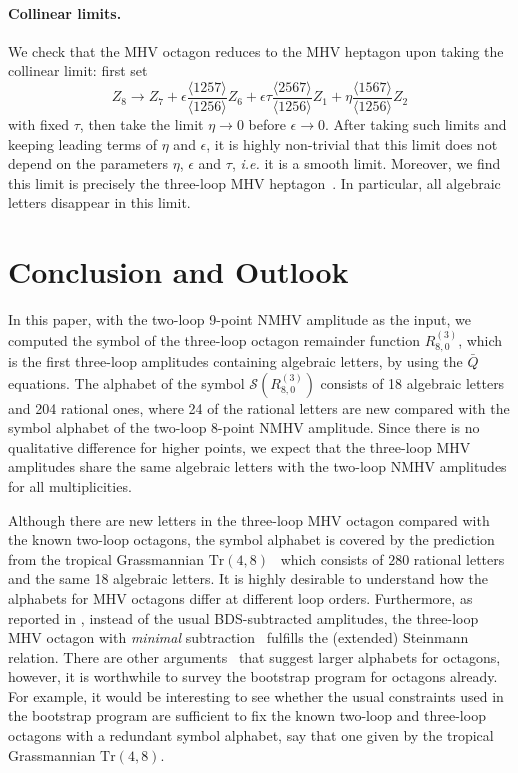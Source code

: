 \documentclass[a4paper,12pt]{article}
\begin{document}
\paragraph*{Collinear limits.} We check that the MHV octagon reduces to the MHV heptagon upon taking the collinear limit: first set 
 \begin{equation*}
     Z_8\to Z_7+
       \epsilon \frac{\langle 1257\rangle }{\langle 1256\rangle } Z_6 + 
       \epsilon \tau \frac{\langle 2567\rangle }{\langle 1256\rangle } Z_1 + \eta \frac{\langle 1567\rangle }{\langle 1256\rangle } Z_2
 \end{equation*}
with fixed $\tau$, then take the limit $\eta\to 0$ before $\epsilon\to 0$. After taking such limits and keeping leading terms of $\eta$ and $\epsilon$, it is highly non-trivial that this limit does not depend on the parameters $\eta$, $\epsilon$ and $\tau$, {\it i.e.} it is a smooth limit. Moreover, we find this limit is precisely the three-loop MHV heptagon~\cite{Drummond:2014ffa}.  In particular, all algebraic letters disappear in this limit. 

\section{Conclusion and Outlook} \label{sec:5} 

In this paper, with the two-loop 9-point NMHV amplitude as the input, we computed the symbol of the three-loop octagon remainder function $R_{8,0}^{(3)}$, which is the first three-loop amplitudes containing algebraic letters, by using the $\bar{Q}$ equations. The alphabet of the symbol $\mathcal{S}(R_{8,0}^{(3)})$ consists of 18 algebraic letters and 204 rational ones, where 24 of the rational letters are new compared with the symbol alphabet of the two-loop 8-point NMHV amplitude. Since there is no qualitative difference for higher points, we expect that the three-loop MHV amplitudes share the same algebraic letters with the two-loop NMHV amplitudes for all multiplicities. 

Although there are new letters in the three-loop MHV octagon compared with the known two-loop octagons, the symbol alphabet is covered by the prediction from the tropical Grassmannian $\mathrm{Tr}(4,8)$~\cite{Henke:2019hve,Drummond:2019cxm} which consists of $280$ rational letters and the same 18 algebraic letters. 
It is highly desirable to understand how the alphabets for MHV octagons differ at different loop orders. Furthermore, 
as reported in \cite{He:2021mme}, instead of the usual BDS-subtracted amplitudes, the three-loop MHV octagon with \emph{minimal} subtraction~\cite{Golden:2018gtk} fulfills the (extended) Steinmann relation. There are other arguments~\cite{Henke:2019hve,Herderschee:2021dez} that suggest larger alphabets for octagons, however, it is worthwhile to survey the bootstrap program for octagons already. For example, it would be interesting to see whether the usual constraints used in the bootstrap program are sufficient to fix the known two-loop and three-loop octagons with a redundant symbol alphabet, say that one given by the tropical Grassmannian $\mathrm{Tr}(4,8)$. 
\end{document}
